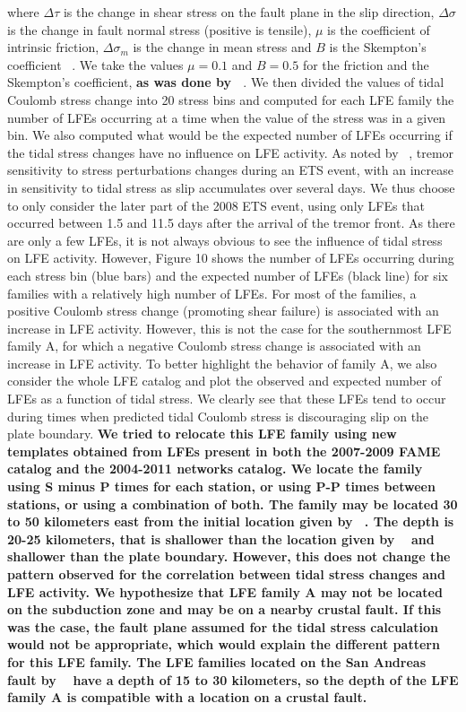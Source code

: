 \documentclass[draft]{agujournal2019}
\begin{document}
where $\Delta \tau$ is the change in shear stress on the fault plane in the slip direction, $\Delta \sigma$ is the change in fault normal stress (positive is tensile), $\mu$ is the coefficient of intrinsic friction, $\Delta \sigma_m$ is the change in mean stress and $B$ is the Skempton's coefficient ~\cite{HOU_2015}. We take the values $\mu = 0.1$ and $B = 0.5$ for the friction and the Skempton's coefficient, \textbf{as was done by ~}. We then divided the values of tidal Coulomb stress change into 20 stress bins and computed for each LFE family the number of LFEs occurring at a time when the value of the stress was in a given bin. We also computed what would be the expected number of LFEs occurring if the tidal stress changes have no influence on LFE activity. As noted by ~, tremor sensitivity to stress perturbations changes during an ETS event, with an increase in sensitivity to tidal stress as slip accumulates over several days. We thus choose to only consider the later part of the 2008 ETS event, using only LFEs that occurred between 1.5 and 11.5 days after the arrival of the tremor front. As there are only a few LFEs, it is not always obvious to see the influence of tidal stress on LFE activity. However, Figure 10 shows the number of LFEs occurring during each stress bin (blue bars) and the expected number of LFEs (black line) for six families with a relatively high number of LFEs. For most of the families, a positive Coulomb stress change (promoting shear failure) is associated with an increase in LFE activity. However, this is not the case for the southernmost LFE family A, for which a negative Coulomb stress change is associated with an increase in LFE activity. To better highlight the behavior of family A, we also consider the whole LFE catalog and plot the observed and expected number of LFEs as a function of tidal stress. We clearly see that these LFEs tend to occur during times when predicted tidal Coulomb stress is discouraging slip on the plate boundary. \textbf{We tried to relocate this LFE family using new templates obtained from LFEs present in both the 2007-2009 FAME catalog and the 2004-2011 networks catalog. We locate the family using S minus P times for each station, or using P-P times between stations, or using a combination of both. The family may be located 30 to 50 kilometers east from the initial location given by ~. The depth is 20-25 kilometers, that is shallower than the location given by ~ and shallower than the plate boundary. However, this does not change the pattern observed for the correlation between tidal stress changes and LFE activity. We hypothesize that LFE family A may not be located on the subduction zone and may be on a nearby crustal fault. If this was the case, the fault plane assumed for the tidal stress calculation would not be appropriate, which would explain the different pattern for this LFE family. The LFE families located on the San Andreas fault by ~ have a depth of 15 to 30 kilometers, so the depth of the LFE family A is compatible with a location on a crustal fault.}
\end{document}
